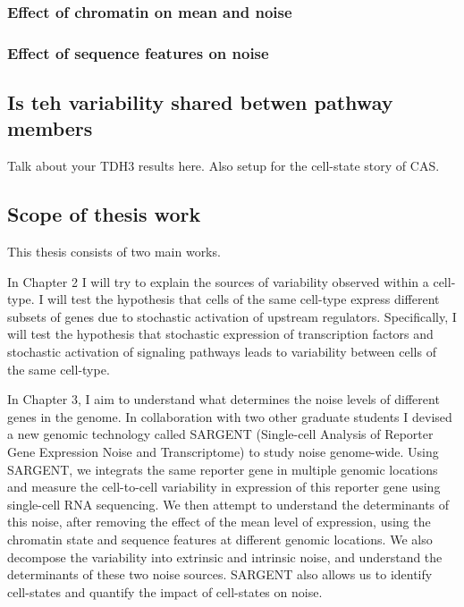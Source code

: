 \subsubsection{Effect of chromatin on mean and noise}
\subsubsection{Effect of sequence features on noise}

\subsection{ Is teh variability shared betwen pathway members}
Talk about your TDH3 results here. Also setup for the cell-state story of CAS.

\subsection{Scope of thesis work}
This thesis consists of two main works.

In  Chapter 2 I will try to explain the sources of variability observed within a cell-type. I will test the hypothesis that cells of the same cell-type express different subsets of genes due to stochastic activation of upstream regulators. Specifically, I will test the hypothesis that stochastic expression of transcription factors and stochastic activation of signaling pathways leads to variability between cells of the same cell-type.

In Chapter 3, I aim to understand what determines the noise levels of different genes in the genome. In collaboration with two other graduate students I devised a new genomic technology called SARGENT (Single-cell Analysis of Reporter Gene Expression Noise and Transcriptome) to study noise genome-wide. Using SARGENT, we integrats the same reporter gene in multiple genomic locations and measure the cell-to-cell variability in expression of this reporter gene using single-cell RNA sequencing. We then attempt to understand the determinants of this noise, after removing the effect of the mean level of expression, using the chromatin state and sequence features at different genomic locations. We also decompose the variability into extrinsic and intrinsic noise, and understand the determinants of these two noise sources. SARGENT also allows us to identify cell-states and quantify the impact of cell-states on noise.
